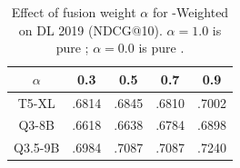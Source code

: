 \begin{table}[!htbp]
\caption{Effect of fusion weight $\alpha$ for \bidir{}-Weighted on DL 2019 (NDCG@10). $\alpha{=}1.0$ is pure \topdown{}; $\alpha{=}0.0$ is pure \bottomup{}.}
\label{tab:ablation_alpha}
\small
\begin{tabular}{ccccc}
\toprule
$\alpha$ & 0.3 & 0.5 & 0.7 & 0.9 \\
\midrule
T5-XL & .6814 & .6845 & .6810 & .7002 \\
Q3-8B & .6618 & .6638 & .6784 & .6898 \\
Q3.5-9B & .6984 & .7087 & .7087 & .7240 \\
\bottomrule
\end{tabular}
\end{table}
